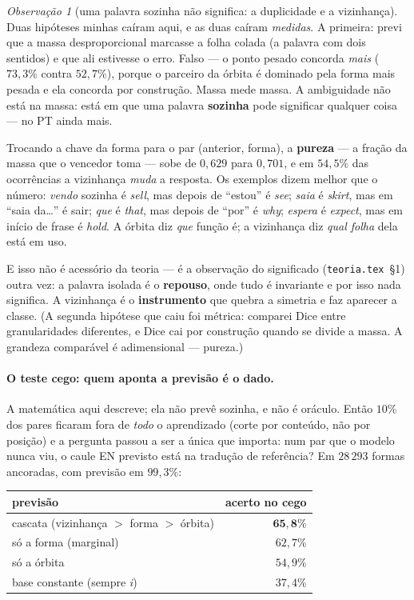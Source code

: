 \documentclass[11pt]{article}
\theoremstyle{plain}
\theoremstyle{remark}
\newtheorem{obs}{Observação}
\begin{document}
\begin{obs}[uma palavra sozinha não significa: a duplicidade e a vizinhança]\label{obs:vizinhanca}
Duas hipóteses minhas caíram aqui, e as duas caíram \emph{medidas}. A primeira: previ que a massa
desproporcional marcasse a folha colada (a palavra com dois sentidos) e que ali estivesse o erro. Falso
--- o ponto pesado concorda \emph{mais} ($73{,}3\%$ contra $52{,}7\%$), porque o parceiro da órbita é
dominado pela forma mais pesada e ela concorda por construção. Massa mede massa. A ambiguidade não está
na massa: está em que uma palavra \textbf{sozinha} pode significar qualquer coisa --- no PT ainda mais.

Trocando a chave da forma para o par (anterior, forma), a \textbf{pureza} --- a fração da massa que o
vencedor toma --- sobe de $0{,}629$ para $0{,}701$, e em $54{,}5\%$ das ocorrências a vizinhança
\emph{muda} a resposta. Os exemplos dizem melhor que o número: \emph{vendo} sozinha é \emph{sell}, mas
depois de ``estou'' é \emph{see}; \emph{saia} é \emph{skirt}, mas em ``saia da\ldots'' é sair;
\emph{que} é \emph{that}, mas depois de ``por'' é \emph{why}; \emph{espera} é \emph{expect}, mas em
início de frase é \emph{hold}. A órbita diz \emph{que} função é; a vizinhança diz \emph{qual folha} dela
está em uso.

E isso não é acessório da teoria --- é a observação do significado (\texttt{teoria.tex}~§1) outra vez: a
palavra isolada é o \textbf{repouso}, onde tudo é invariante e por isso nada significa. A vizinhança é o
\textbf{instrumento} que quebra a simetria e faz aparecer a classe. (A segunda hipótese que caiu foi
métrica: comparei Dice entre granularidades diferentes, e Dice cai por construção quando se divide a
massa. A grandeza comparável é adimensional --- pureza.)
\end{obs}

\paragraph{O teste cego: quem aponta a previsão é o dado.} A matemática aqui descreve; ela não prevê
sozinha, e não é oráculo. Então $10\%$ dos pares ficaram fora de \emph{todo} o aprendizado (corte por
conteúdo, não por posição) e a pergunta passou a ser a única que importa: num par que o modelo nunca
viu, o caule EN previsto está na tradução de referência? Em $28\,293$ formas ancoradas, com previsão em
$99{,}3\%$:

\begin{center}\small
\begin{tabular}{lr}
\toprule
previsão & acerto no cego \\
\midrule
cascata (vizinhança $>$ forma $>$ órbita) & $\mathbf{65{,}8\%}$ \\
só a forma (marginal) & $62{,}7\%$ \\
só a órbita & $54{,}9\%$ \\
base constante (sempre \emph{i}) & $37{,}4\%$ \\
\bottomrule
\end{tabular}
\end{center}
\end{document}

